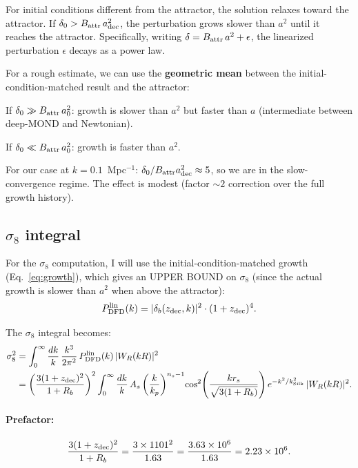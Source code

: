 \documentclass[11pt]{article}
\newcommand{\ee}[1]{\times 10^{#1}}
\newcommand{\kSilk}{k_{\rm Silk}}
\begin{document}
For initial conditions different from the attractor, the solution
relaxes toward the attractor. If $\delta_0 > B_{\rm attr}\,a_{\rm dec}^2$,
the perturbation grows slower than $a^2$ until it reaches the
attractor. Specifically, writing $\delta = B_{\rm attr}\,a^2 + \epsilon$,
the linearized perturbation $\epsilon$ decays as a power law.

For a rough estimate, we can use the \textbf{geometric mean}
between the initial-condition-matched result and the attractor:

If $\delta_0 \gg B_{\rm attr}\,a_0^2$: growth is slower than $a^2$
but faster than $a$ (intermediate between deep-MOND and Newtonian).

If $\delta_0 \ll B_{\rm attr}\,a_0^2$: growth is faster than $a^2$.

For our case at $k = 0.1$~Mpc$^{-1}$:
$\delta_0/B_{\rm attr}a_{\rm dec}^2 \approx 5$, so we are in the
slow-convergence regime. The effect is modest (factor $\sim 2$
correction over the full growth history).

\subsection{$\sigma_8$ integral}

For the $\sigma_8$ computation, I will use the initial-condition-matched
growth (Eq.~\ref{eq:growth}), which gives an UPPER BOUND on $\sigma_8$
(since the actual growth is slower than $a^2$ when above the attractor):
\begin{equation}
P_{\rm DFD}^{\rm lin}(k)
= |\delta_b(z_{\rm dec}, k)|^2\cdot(1+z_{\rm dec})^4.
\label{eq:PDFD}
\end{equation}

The $\sigma_8$ integral becomes:
\begin{align}
\sigma_8^2 &= \int_0^\infty\frac{dk}{k}\,
\frac{k^3}{2\pi^2}\,P_{\rm DFD}^{\rm lin}(k)\,|W_R(kR)|^2 \notag\\
&= \left(\frac{3(1+z_{\rm dec})^2}{1+R_b}\right)^2
\int_0^\infty\frac{dk}{k}\,
A_s\left(\frac{k}{k_p}\right)^{n_s-1}\!
\cos^2\!\left(\frac{kr_s}{\sqrt{3(1+R_b)}}\right)
e^{-k^2/\kSilk^2}\,|W_R(kR)|^2.
\label{eq:sigma8-int}
\end{align}

\paragraph{Prefactor:}
\begin{equation}
\frac{3(1+z_{\rm dec})^2}{1+R_b}
= \frac{3\times 1101^2}{1.63}
= \frac{3.63\ee{6}}{1.63}
= 2.23\ee{6}.
\end{equation}
\end{document}

